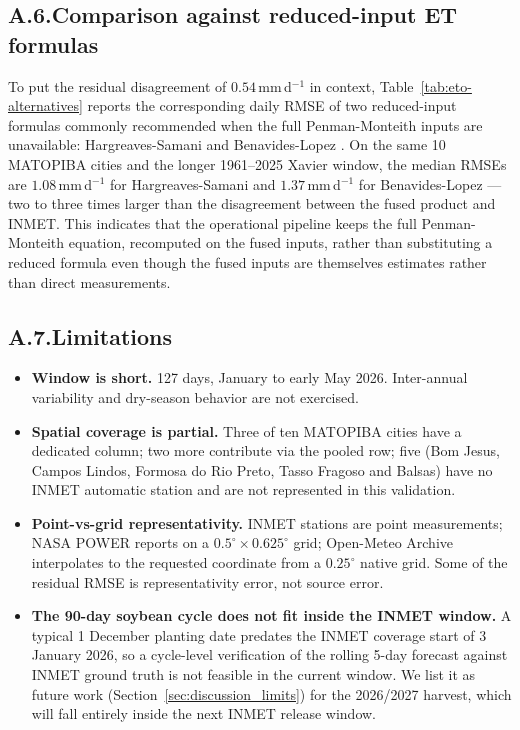 \subsection*{A.6.\quad Comparison against reduced-input ET formulas}

To put the residual disagreement of $0.54$\,mm\,d$^{-1}$ in context,
Table~\ref{tab:eto-alternatives} reports the corresponding daily
RMSE of two reduced-input formulas commonly recommended when the
full Penman-Monteith inputs are unavailable: Hargreaves-Samani
\citep{Hargreaves1985} and Benavides-Lopez \citep{Benavides1970}.
On the same 10 MATOPIBA cities and the longer 1961--2025 Xavier
window, the median RMSEs are $1.08$\,mm\,d$^{-1}$ for
Hargreaves-Samani and $1.37$\,mm\,d$^{-1}$ for Benavides-Lopez ---
two to three times larger than the disagreement between the fused
product and INMET. This indicates that the operational pipeline
keeps the full Penman-Monteith equation, recomputed on the fused
inputs, rather than substituting a reduced formula even though the
fused inputs are themselves estimates rather than direct measurements.

\subsection*{A.7.\quad Limitations}

\begin{itemize}
  \item \textbf{Window is short.} 127 days, January to early May 2026.
  Inter-annual variability and dry-season behavior are not exercised.
  \item \textbf{Spatial coverage is partial.} Three of ten MATOPIBA
  cities have a dedicated column; two more contribute via the pooled
  row; five (Bom Jesus, Campos Lindos, Formosa do Rio Preto, Tasso
  Fragoso and Balsas) have no INMET automatic station and are not
  represented in this validation.
  \item \textbf{Point-vs-grid representativity.} INMET stations are
  point measurements; NASA POWER reports on a $0.5^\circ\times
  0.625^\circ$ grid; Open-Meteo Archive interpolates to the requested
  coordinate from a $0.25^\circ$ native grid. Some of the residual
  RMSE is representativity error, not source error.
  \item \textbf{The 90-day soybean cycle does not fit inside the
  INMET window.} A typical 1 December planting date predates the
  INMET coverage start of 3 January 2026, so a cycle-level
  verification of the rolling 5-day forecast against INMET ground
  truth is not feasible in the current window. We list it as future
  work (Section~\ref{sec:discussion_limits}) for the
  2026/2027 harvest, which will fall entirely inside the next INMET
  release window.
\end{itemize}

